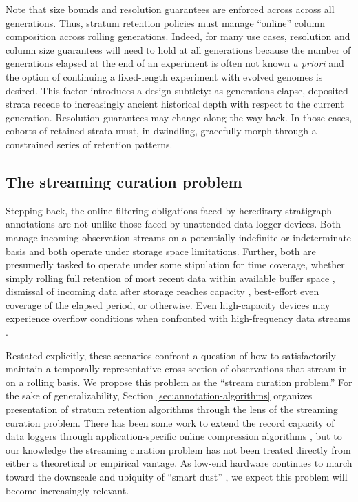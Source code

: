 Note that size bounds and resolution guarantees are enforced across across all generations.
Thus, stratum retention policies must manage ``online'' column composition across rolling generations.
Indeed, for many use cases, resolution and column size guarantees will need to hold at all generations because the number of generations elapsed at the end of an experiment is often not known \textit{a priori} and the option of continuing a fixed-length experiment with evolved genomes is desired.
This factor introduces a design subtlety: as generations elapse, deposited strata recede to increasingly ancient historical depth with respect to the current generation.
Resolution guarantees may change along the way back.
In those cases, cohorts of retained strata must, in dwindling, gracefully morph through a constrained series of retention patterns.

\subsection{The streaming curation problem}

Stepping back, the online filtering obligations faced by hereditary stratigraph annotations are not unlike those faced by unattended data logger devices.
Both manage incoming observation streams on a potentially indefinite or indeterminate basis and both operate under storage space limitations.
Further, both are presumedly tasked to operate under some stipulation for time coverage, whether simply rolling full retention of most recent data within available buffer space \citep{fincham1995use}, dismissal of incoming data after storage reaches capacity \citep{saunders1989portable,mahzan2017design}, best-effort even coverage of the elapsed period, or otherwise.
Even high-capacity devices may experience overflow conditions when confronted with high-frequency data streams \citep{luharuka2003design}.

Restated explicitly, these scenarios confront a question of how to satisfactorily maintain a temporally representative cross section of observations that stream in on a rolling basis.
We propose this problem as the ``stream curation problem.''
For the sake of generalizability, Section \ref{sec:annotation-algorithms} organizes presentation of stratum retention algorithms through the lens of the streaming curation problem.
There has been some work to extend the record capacity of data loggers through application-specific online compression algorithms \citep{hadiatna2016design}, but to our knowledge the streaming curation problem has not been treated directly from either a theoretical or empirical vantage.
As low-end hardware continues to march toward the downscale and ubiquity of ``smart dust'' \citep{warneke2001smart}, we expect this problem will become increasingly relevant.

